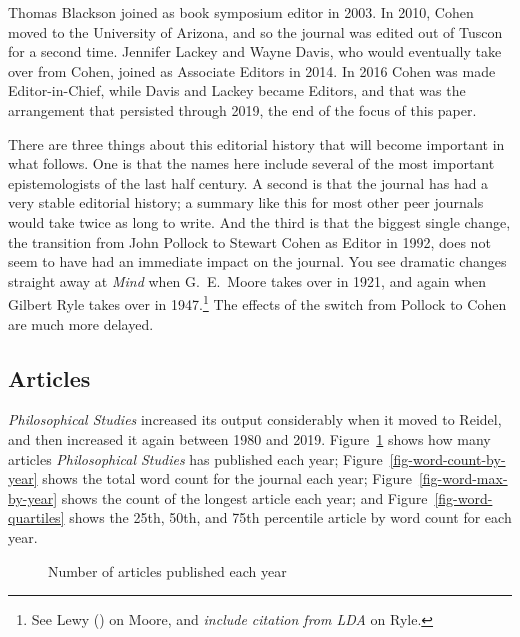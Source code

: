 \documentclass[
  10pt,
  letterpaper,
  DIV=11,
  numbers=noendperiod,
  twoside]{scrartcl}
\begin{document}
Thomas Blackson joined as book symposium editor in 2003. In 2010, Cohen
moved to the University of Arizona, and so the journal was edited out of
Tuscon for a second time. Jennifer Lackey and Wayne Davis, who would
eventually take over from Cohen, joined as Associate Editors in 2014. In
2016 Cohen was made Editor-in-Chief, while Davis and Lackey became
Editors, and that was the arrangement that persisted through 2019, the
end of the focus of this paper.

There are three things about this editorial history that will become
important in what follows. One is that the names here include several of
the most important epistemologists of the last half century. A second is
that the journal has had a very stable editorial history; a summary like
this for most other peer journals would take twice as long to write. And
the third is that the biggest single change, the transition from John
Pollock to Stewart Cohen as Editor in 1992, does not seem to have had an
immediate impact on the journal. You see dramatic changes straight away
at \emph{Mind} when G.~E.~Moore takes over in 1921, and again when
Gilbert Ryle takes over in 1947.\footnote{See Lewy
  () on Moore, and \emph{include citation
  from LDA} on Ryle.} The effects of the switch from Pollock to Cohen
are much more delayed.

\subsection{Articles}\label{articles}

\emph{Philosophical Studies} increased its output considerably when it
moved to Reidel, and then increased it again between 1980 and 2019.
Figure~\ref{fig-article-count-by-year} shows how many articles
\emph{Philosophical Studies} has published each year;
Figure~\ref{fig-word-count-by-year} shows the total word count for the
journal each year; Figure~\ref{fig-word-max-by-year} shows the count of
the longest article each year; and Figure~\ref{fig-word-quartiles} shows
the 25th, 50th, and 75th percentile article by word count for each year.

\begin{figure}


\caption{\label{fig-article-count-by-year}Number of articles published
each year}

\end{figure}%
\end{document}

